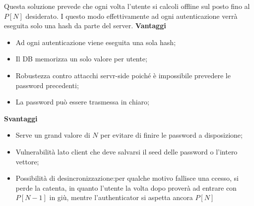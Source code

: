 \documentclass{book}
\theoremstyle{remark}
\begin{document}
Questa soluzione prevede che ogni volta l'utente si calcoli offline sul posto fino al \(P[N]\) desiderato\@. I questo modo effettivamente ad ogni autenticazione verrà eseguita solo una hash da parte del server\@.
\textbf{Vantaggi}
\begin{itemize}
	\item Ad ogni autenticazione viene eseguita una sola hash;\@
	\item Il DB memorizza un solo valore per utente;\@
	\item Robustezza contro attacchi servr-side poiché è impossibile prevedere le password precedenti;\@
	\item La password può essere trasmessa in chiaro;\@
\end{itemize}
\textbf{Svantaggi}
\begin{itemize}
	\item Serve un grand valore di \(N\) per evitare di finire le password a disposizione;\@
	\item Vulnerabilità lato client che deve salvarsi il seed delle password o l'intero vettore;\@
	\item Possibilità di desincronizzazione:\@se per qualche motivo fallisce una ccesso, si perde la catenta, in quanto l'utente la volta dopo proverà ad entrare con \(P[N-1]\) in giù, mentre l'authenticator si aspetta ancora \(P[N]\)
\end{itemize}
\end{document}
